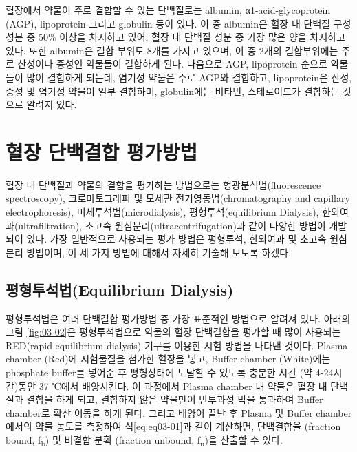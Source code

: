 \documentclass[
  11pt,
  krantz2, a4paper, twoside]{krantz}
\begin{document}
혈장에서 약물이 주로 결합할 수 있는 단백질로는 albumin,
α1-acid-glycoprotein (AGP), lipoprotein 그리고 globulin 등이 있다. 이 중
albumin은 혈장 내 단백질 구성 성분 중 50\% 이상을 차지하고 있어, 혈장 내
단백질 성분 중 가장 많은 양을 차지하고 있다. 또한 albumin은 결합 부위도
8개를 가지고 있으며, 이 중 2개의 결합부위에는 주로 산성이나 중성인
약물들이 결합하게 된다. 다음으로 AGP, lipoprotein 순으로 약물들이 많이
결합하게 되는데, 염기성 약물은 주로 AGP와 결합하고, lipoprotein은 산성,
중성 및 염기성 약물이 일부 결합하며, globulin에는 비타민, 스테로이드가
결합하는 것으로 알려져 있다.

\section{혈장 단백결합 평가방법}\label{uxd608uxc7a5-uxb2e8uxbc31uxacb0uxd569-uxd3c9uxac00uxbc29uxbc95}

혈장 내 단백질과 약물의 결합을 평가하는 방법으로는 형광분석법(fluorescence spectroscopy), 크로마토그래피 및 모세관 전기영동법(chromatography and capillary electrophoresis),
미세투석법(microdialysis), 평형투석(equilibrium Dialysis), 한외여과(ultrafiltration), 초고속 원심분리(ultracentrifugation)과 같이
다양한 방법이 개발되어 있다. 가장 일반적으로 사용되는 평가 방법은
평형투석, 한외여과 및 초고속 원심분리 방법이며, 이 세 가지 방법에 대해서
자세히 기술해 보도록 하겠다.

\subsection{평형투석법(Equilibrium Dialysis)}\label{uxd3c9uxd615uxd22cuxc11duxbc95equilibrium-dialysis}

평형투석법은 여러 단백결합 평가방법 중 가장 표준적인 방법으로 알려져 있다. 아래의 그림 \ref{fig:03-02}은 평형투석법으로 약물의 혈장
단백결합을 평가할 때 많이 사용되는 RED(rapid equilibrium dialysis) 기구를 이용한 시험 방법을 나타낸 것이다. Plasma chamber (Red)에
시험물질을 첨가한 혈장을 넣고, Buffer chamber (White)에는 phosphate
buffer를 넣어준 후 평형상태에 도달할 수 있도록 충분한 시간 (약
4-24시간)동안 37 ℃에서 배양시킨다. 이 과정에서 Plasma chamber 내 약물은
혈장 내 단백질과 결합을 하게 되고, 결합하지 않은 약물만이 반투과성 막을
통과하여 Buffer chamber로 확산 이동을 하게 된다. 그리고 배양이 끝난 후
Plasma 및 Buffer chamber에서의 약물 농도를 측정하여 식\eqref{eq:eq03-01}과 같이
계산하면, 단백결합율 (fraction bound, f\textsubscript{b}) 및 비결합 분획 (fraction
unbound, f\textsubscript{u})을 산출할 수 있다.
\end{document}
